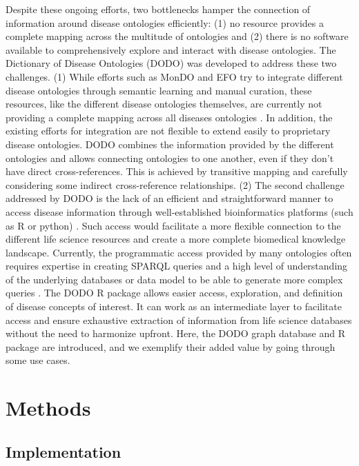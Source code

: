 \documentclass[9pt,a4paper,]{extarticle}
\begin{document}
Despite these ongoing efforts, two bottlenecks hamper the connection of information around disease ontologies efficiently: (1) no resource provides a complete mapping across the multitude of ontologies and (2) there is no software available to comprehensively explore and interact with disease ontologies. The Dictionary of Disease Ontologies (DODO) was developed to address these two challenges. (1) While efforts such as MonDO and EFO try to integrate different disease ontologies through semantic learning and manual curation, these resources, like the different disease ontologies themselves, are currently not providing a complete mapping across all diseases ontologies \citep{Hu2017, Rappaport2013}. In addition, the existing efforts for integration are not flexible to extend easily to proprietary disease ontologies. DODO combines the information provided by the different ontologies and allows connecting ontologies to one another, even if they don't have direct cross-references. This is achieved by transitive mapping and carefully considering some indirect cross-reference relationships. (2) The second challenge addressed by DODO is the lack of an efficient and straightforward manner to access disease information through well-established bioinformatics platforms (such as R or python) \citep{Rappaport2013, Saqi2019}. Such access would facilitate a more flexible connection to the different life science resources and create a more complete biomedical knowledge landscape. Currently, the programmatic access provided by many ontologies often requires expertise in creating SPARQL queries and a high level of understanding of the underlying databases or data model to be able to generate more complex queries \citep{Hasnain2014, Hu2017, Rappaport2013}. The DODO R package allows easier access, exploration, and definition of disease concepts of interest. It can work as an intermediate layer to facilitate access and ensure exhaustive extraction of information from life science databases without the need to harmonize upfront. Here, the DODO graph database and R package are introduced, and we exemplify their added value by going through some use cases.

\hypertarget{methods}{%
\section{Methods}\label{methods}}

\hypertarget{implementation}{%
\subsection{Implementation}\label{implementation}}
\end{document}
